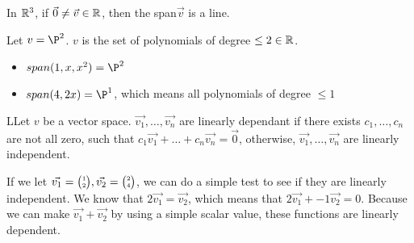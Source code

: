   In $\mathbb{R}^3$, if $\vec{0}\neq\vec{v}\in\mathbb{R}$, then the span$\vec{v}$ is a line.

  \begin{problem}
    Let $v=\P^2$. $v$ is the set of polynomials of degree $\le2\in\mathbb{R}$.

    \begin{itemize}
      \item $span(1,x,x^2)=\P^2$
      \item $span(4,2x)=\P^1$, which means all polynomials of degree $\le1$
    \end{itemize}

  \end{problem}
  \begin{definition}
    LLet $v$ be a vector space. $\vec{v_1},\dots,\vec{v_n}$ are linearly dependant if there exists $c_1,\dots,c_n$ are not all zero, such that $c_1\vec{v_1}+\dots+c_n\vec{v_n}=\vec{0}$, otherwise, $\vec{v_1},\dots,\vec{v_n}$ are linearly independent.
  \end{definition}
  
  If we let $\vec{v_1}=\SmallMatrix{1\\2},\vec{v_2}=\SmallMatrix{2\\4}$, we can do a simple test to see if they are linearly independent. We know that $2\vec{v_1}=\vec{v_2}$, which means that $2\vec{v_1}+-1\vec{v_2}=0$. Because we can make $\vec{v_1}+\vec{v_2}$ by using a simple scalar value, these functions are linearly dependent.

